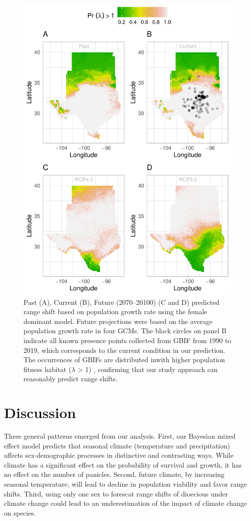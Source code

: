 \documentclass[12pt]{article}
\begin{document}
\begin{figure}[H]
  \begin{center}
    \includegraphics[width=0.75\linewidth]{Figures/Fig_geoPrlambdaprojection_fd_miroc.pdf}
  \caption{Past (A), Current (B), Future (2070–20100) (C and D) predicted range shift based on population growth rate using the female dominant model. Future projections were based on the average population growth rate in four GCMs. The black circles on panel B indicate all known presence points collected from GBIF from 1990 to 2019, which corresponds to the current condition in our prediction.  The occurrences of GBIFs are distributed inwith higher population fitness habitat ($\lambda$ > 1) , confirming that our study approach can reasonably predict range shifts. }
  \label{fig:geoprojfdmiroc}
  \end{center}
\end{figure}

\section*{Discussion}
Three general patterns emerged from our analysis. First, our Bayesian mixed effect model predicts that seasonal climate (temperature and precipitation) affects sex-demographic processes in distinctive and contrasting ways.
While climate has a significant effect on the probability of survival and growth, it has no effect on the number of panicles. Second, future climate, by increasing seasonal temperature, will lead to decline in population viability and favor range shifts. 
Third, using only one sex to forescat range shifts of dioecious under climate change could lead to an underestimation of the impact of  climate change on species.
\end{document}
